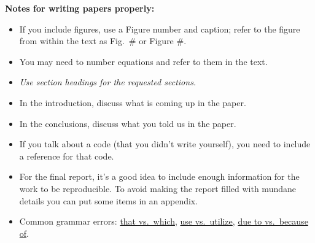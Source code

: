 \textbf{Notes for writing papers properly:}
\begin{itemize}
\item If you include figures, use a Figure number and caption; refer to the figure from within the text as Fig.\ \# or Figure \#.
\item You may need to number equations and refer to them in the text.
\item \textit{Use section headings for the requested sections.}
\item In the introduction, discuss what is coming up in the paper. 
\item In the conclusions, discuss what you told us in the paper.
\item If you talk about a code (that you didn't write yourself), you need to include a reference for that code. 
\item For the final report, it's a good idea to include enough information for the work to be reproducible. To avoid making the report filled with mundane details you can put some items in an appendix.
\item Common grammar errors: \href{http://www.quickanddirtytips.com/education/grammar/which-versus-that-0}{that vs.\ which}, \href{http://grammarpartyblog.com/2012/01/17/use-versus-utilize/}{use vs.\ utilize}, \href{https://e-gmat.com/blog/gmat-verbal/sentence-correction/idioms/due-to-vs-because-of}{due to vs.\ because of}.
\end{itemize}